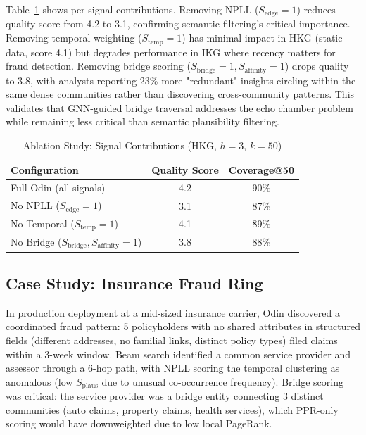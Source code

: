 \documentclass[10pt,twocolumn]{article}
\begin{document}
Table~\ref{tab:ablation} shows per-signal contributions. Removing NPLL ($S_{\text{edge}} = 1$) reduces quality score from 4.2 to 3.1, confirming semantic filtering's critical importance. Removing temporal weighting ($S_{\text{temp}} = 1$) has minimal impact in HKG (static data, score 4.1) but degrades performance in IKG where recency matters for fraud detection. Removing bridge scoring ($S_{\text{bridge}} = 1, S_{\text{affinity}} = 1$) drops quality to 3.8, with analysts reporting 23\% more "redundant" insights circling within the same dense communities rather than discovering cross-community patterns. This validates that GNN-guided bridge traversal addresses the echo chamber problem while remaining less critical than semantic plausibility filtering.

\begin{table}[t]
\centering
\small
\caption{Ablation Study: Signal Contributions (HKG, $h=3$, $k=50$)}
\label{tab:ablation}
\begin{tabular}{@{}lcc@{}}
\toprule
\textbf{Configuration} & \textbf{Quality Score} & \textbf{Coverage@50} \\ \midrule
Full Odin (all signals) & 4.2 & 90\% \\
No NPLL ($S_{\text{edge}} = 1$) & 3.1 & 87\% \\
No Temporal ($S_{\text{temp}} = 1$) & 4.1 & 89\% \\
No Bridge ($S_{\text{bridge}}, S_{\text{affinity}} = 1$) & 3.8 & 88\% \\
\bottomrule
\end{tabular}
\end{table}

\subsection{Case Study: Insurance Fraud Ring}

In production deployment at a mid-sized insurance carrier, Odin discovered a coordinated fraud pattern: 5 policyholders with no shared attributes in structured fields (different addresses, no familial links, distinct policy types) filed claims within a 3-week window. Beam search identified a common service provider and assessor through a 6-hop path, with NPLL scoring the temporal clustering as anomalous (low $S_{\text{plaus}}$ due to unusual co-occurrence frequency). Bridge scoring was critical: the service provider was a bridge entity connecting 3 distinct communities (auto claims, property claims, health services), which PPR-only scoring would have downweighted due to low local PageRank.
\end{document}
